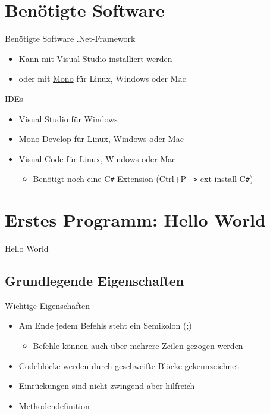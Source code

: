\section{Benötigte Software}
\begin{frame}{Benötigte Software}
	.Net-Framework
	\begin{itemize}
		\item Kann mit Visual Studio installiert werden
		\item oder mit \href{http://www.mono-project.com/}{Mono} für Linux, Windows oder Mac
	\end{itemize}
	IDEs
	\begin{itemize}
		\item \href{https://www.visualstudio.com/}{Visual Studio} für Windows
		\item \href{http://www.monodevelop.com/}{Mono Develop} für Linux, Windows oder Mac
		\item \href{https://www.visualstudio.com/de-de/products/code-vs.aspx}{Visual Code} für Linux, Windows oder Mac
		\begin{itemize}
			\item Benötigt noch eine C\texttt{\#}-Extension (Ctrl+P \texttt{->} ext install C\texttt{\#})
		\end{itemize}
	\end{itemize}
\end{frame}


\section{Erstes Programm: Hello World}
\begin{frame}{Hello World}
       
\end{frame} 

\subsection{Grundlegende Eigenschaften}
\begin{frame}{Wichtige Eigenschaften}
	\begin{itemize}
		\item Am Ende jedem Befehls steht ein Semikolon (;)
		\begin{itemize}
			\item Befehle können auch über mehrere Zeilen gezogen werden
		\end{itemize}
		\item Codeblöcke werden durch geschweifte Blöcke gekennzeichnet
		\item Einrückungen sind nicht zwingend aber hilfreich
		\item Methodendefinition
	\end{itemize}
\end{frame}


